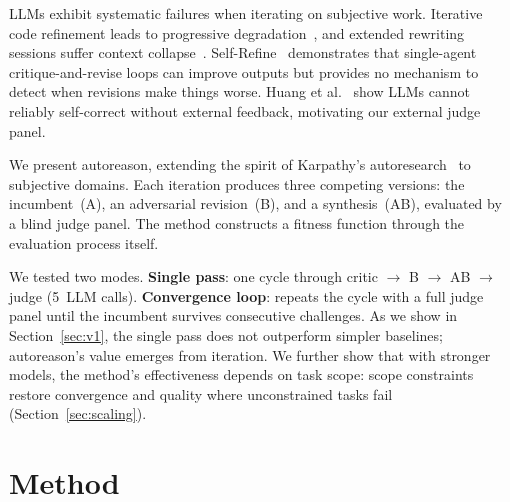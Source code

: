 \documentclass[10pt,twocolumn]{article}
\begin{document}
LLMs exhibit systematic failures when iterating on subjective work. Iterative code refinement leads to progressive degradation~\cite{slopcodebench}, and extended rewriting sessions suffer context collapse~\cite{ace}. Self-Refine~\cite{selfrefine} demonstrates that single-agent critique-and-revise loops can improve outputs but provides no mechanism to detect when revisions make things worse. Huang et al.~\cite{huang2023} show LLMs cannot reliably self-correct without external feedback, motivating our external judge panel.

We present autoreason, extending the spirit of Karpathy's autoresearch~\cite{autoresearch} to subjective domains. Each iteration produces three competing versions: the incumbent~(A), an adversarial revision~(B), and a synthesis~(AB), evaluated by a blind judge panel. The method constructs a fitness function through the evaluation process itself.

We tested two modes. \textbf{Single pass}: one cycle through critic $\to$ B $\to$ AB $\to$ judge (5~LLM calls). \textbf{Convergence loop}: repeats the cycle with a full judge panel until the incumbent survives consecutive challenges. As we show in Section~\ref{sec:v1}, the single pass does not outperform simpler baselines; autoreason's value emerges from iteration. We further show that with stronger models, the method's effectiveness depends on task scope: scope constraints restore convergence and quality where unconstrained tasks fail (Section~\ref{sec:scaling}).

\section{Method}
\end{document}
